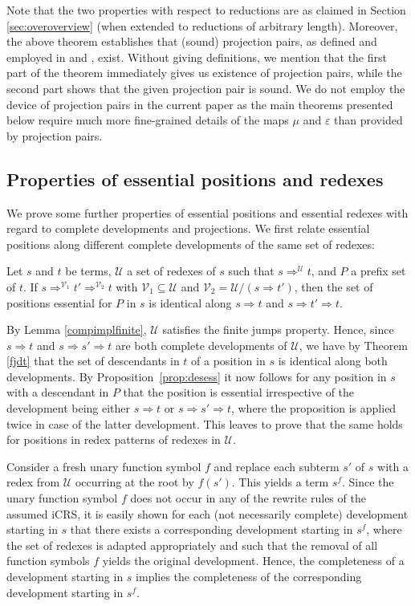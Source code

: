 \documentclass{LMCS}
\theoremstyle{definition}
\newcommand{\dev}{\Rightarrow}
\newcommand{\pmap}{\varepsilon}
\newcommand{\pme}{\mu}
\begin{document}
Note that the two properties with respect to reductions are as claimed in Section \ref{sec:overoverview} (when extended to reductions of arbitrary length).
Moreover, 
the above theorem establishes that (sound) projection pairs, as defined and employed in \cite{K08} and \cite{paper_iv}, exist. Without giving definitions, we mention that the first part of the theorem immediately gives us existence of projection pairs, while the second part shows that the given projection pair is sound. We do not employ the device of projection pairs in the current paper as the main theorems presented below require much more fine-grained details of the maps $\pme$ and $\pmap$ than provided by projection pairs.

\subsection{Properties of essential positions and redexes}
\label{sec:ess_prop}

We prove some further properties of essential positions and essential redexes with regard to complete developments and projections. We first relate essential positions along different complete developments of the same set of redexes:
\begin{lem}
\label{lem:devsplit}
Let $s$ and $t$ be terms, $\mathcal{U}$ a set of redexes of $s$ such that $s \dev^\mathcal{U} t$, and $P$ a prefix set of $t$. If $s \dev^{\mathcal{V}_1} t' \dev^{\mathcal{V}_2} t$ with $\mathcal{V}_1 \subseteq \mathcal{U}$ and $\mathcal{V}_2 = \mathcal{U}/(s \dev t')$, then the set of positions essential for $P$ in $s$ is identical along $s \dev t$ and $s \dev t' \dev t$.
\end{lem}

\proof
By Lemma \ref{compimplfinite}, $\mathcal{U}$ satisfies the finite jumps property. Hence, since $s \dev t$ and $s \dev s' \dev t$ are both complete developments of $\mathcal{U}$, we have by Theorem \ref{fjdt} that the set of descendants in $t$ of a position in $s$ is identical along both developments. By Proposition~\ref{prop:desess} it now follows for any position in $s$ with a descendant in $P$ that the position is essential irrespective of the development being either $s \dev t$ or $s \dev s' \dev t$, where the proposition is applied twice in case of the latter development. This leaves to prove that the same holds for positions in redex patterns of redexes in $\mathcal{U}$.

Consider a fresh unary function symbol $f$ and replace each subterm $s'$ of $s$ with a redex from $\mathcal{U}$ occurring at the root by $f(s')$. This yields a term $s^f$. Since the unary function symbol $f$ does not occur in any of the rewrite rules of the assumed iCRS, it is easily shown for each (not necessarily complete) development starting in $s$ that there exists a corresponding development starting in $s^f$, where the set of redexes is adapted appropriately and such that the removal of all function symbols $f$ yields the original development. Hence, the completeness of a development starting in $s$ implies the completeness of the corresponding development starting in $s^f$.
\end{document}

